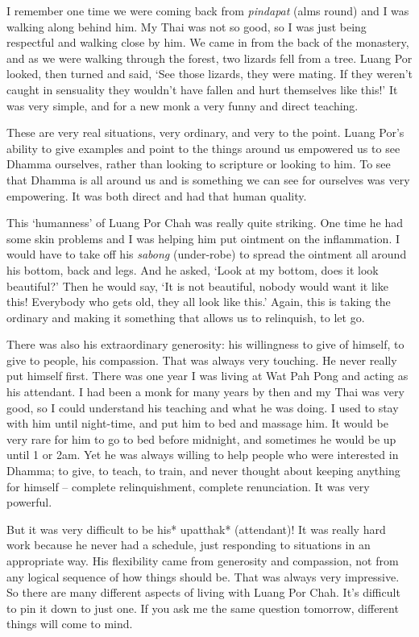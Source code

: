 I remember one time we were coming back from \emph{pindapat} (alms
round) and I was walking along behind him. My Thai was not so good, so I
was just being respectful and walking close by him. We came in from the
back of the monastery, and as we were walking through the forest, two
lizards fell from a tree. Luang Por looked, then turned and said, `See
those lizards, they were mating. If they weren't caught in sensuality
they wouldn't have fallen and hurt themselves like this!' It was very
simple, and for a new monk a very funny and direct teaching. 

These are very real situations, very ordinary, and very to the point. 
Luang Por's ability to give examples and point to the things around us
empowered us to see Dhamma ourselves, rather than looking to scripture
or looking to him. To see that Dhamma is all around us and is something
we can see for ourselves was very empowering. It was both direct and had
that human quality. 

This `humanness' of Luang Por Chah was really quite striking. One time
he had some skin problems and I was helping him put ointment on the
inflammation. I would have to take off his \emph{sabong} (under-robe) to
spread the ointment all around his bottom, back and legs. And he asked, 
`Look at my bottom, does it look beautiful?' Then he would say, `It is
not beautiful, nobody would want it like this! Everybody who gets old, 
they all look like this.' Again, this is taking the ordinary and making
it something that allows us to relinquish, to let go. 

There was also his extraordinary generosity: his willingness to give of
himself, to give to people, his compassion. That was always very
touching. He never really put himself first. There was one year I was
living at Wat Pah Pong and acting as his attendant. I had been a monk
for many years by then and my Thai was very good, so I could understand
his teaching and what he was doing. I used to stay with him until
night-time, and put him to bed and massage him. It would be very rare
for him to go to bed before midnight, and sometimes he would be up until
1 or 2am. Yet he was always willing to help people who were interested
in Dhamma; to give, to teach, to train, and never thought about keeping
anything for himself -- complete relinquishment, complete renunciation. 
It was very powerful. 

But it was very difficult to be his* upatthak* (attendant)! It was
really hard work because he never had a schedule, just responding to
situations in an appropriate way. His flexibility came from generosity
and compassion, not from any logical sequence of how things should be. 
That was always very impressive. So there are many different aspects of
living with Luang Por Chah. It's difficult to pin it down to just one. 
If you ask me the same question tomorrow, different things will come to
mind. 

